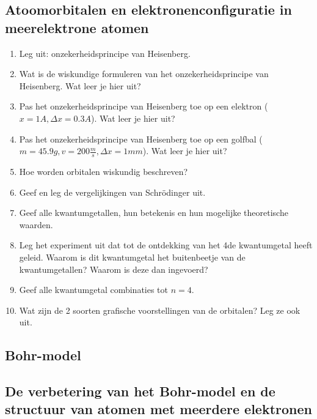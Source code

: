 \documentclass[a4paper,12pt]{article}
\begin{document}
    \subsection*{Atoomorbitalen en elektronenconfiguratie in meerelektrone atomen}
    \begin{enumerate}
        \item Leg uit: onzekerheidsprincipe van Heisenberg.
        \item Wat is de wiskundige formuleren van het onzekerheidsprincipe van Heisenberg. Wat leer je hier uit?
        \item Pas het onzekerheidsprincipe van Heisenberg toe op een elektron ($x=1 A  , \Delta x = 0.3 A$). Wat leer je hier uit?
        \item Pas het onzekerheidsprincipe van Heisenberg toe op een golfbal ($m=45.9g , v=200 \frac{m}{s}, \Delta x = 1mm$). Wat leer je hier uit?
        \item Hoe worden orbitalen wiskundig beschreven?
        \item Geef en leg de vergelijkingen van Schrödinger uit.
        \item Geef alle kwantumgetallen, hun betekenis en hun mogelijke theoretische waarden.
        \item Leg het experiment uit dat tot de ontdekking van het 4de kwantumgetal heeft geleid. Waarom is dit kwantumgetal het buitenbeetje van de kwantumgetallen? Waarom is deze dan ingevoerd?
        \item Geef alle kwantumgetal combinaties tot $n=4$.
        \item Wat zijn de 2 soorten grafische voorstellingen van de orbitalen? Leg ze ook uit.
    \end{enumerate}

    \subsection{Bohr-model}

    \subsection{De verbetering van het Bohr-model en de structuur van atomen met meerdere elektronen}
\end{document}
